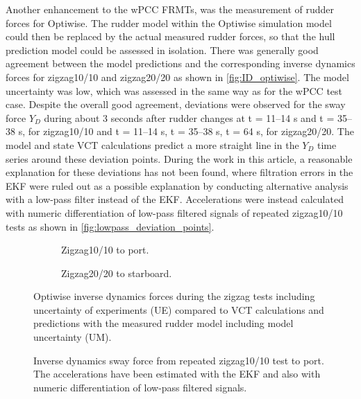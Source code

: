 Another enhancement to the wPCC FRMTs, was the measurement of rudder forces for Optiwise.
The rudder model within the Optiwise simulation model could then be replaced by the actual measured rudder forces, so that the hull prediction model could be assessed in isolation. There was generally good agreement between the model predictions and the corresponding inverse dynamics forces for zigzag10/10  and zigzag20/20 as shown in \autoref{fig:ID_optiwise}. The model uncertainty was low, which was assessed in the same way as for the wPCC test case.
Despite the overall good agreement, deviations were observed for the sway force $Y_D$ during about 3 seconds after rudder changes at t = 11--14 s and t = 35--38 s, for zigzag10/10 and t = 11--14 s, t = 35--38 s, t = 64 s, for zigzag20/20. The model and state VCT calculations predict a more straight line in the $Y_D$ time series around these deviation points. 
During the work in this article, a reasonable explanation for these deviations has not been found, where filtration errors in the EKF were ruled out as a possible explanation by conducting alternative analysis with a low-pass filter instead of the EKF. Accelerations were instead calculated with numeric differentiation of low-pass filtered signals of repeated zigzag10/10 tests as shown in \autoref{fig:lowpass_deviation_points}.
\begin{figure}[h]
    \centering
    \begin{subfigure}[b]{\textwidth}
        \centering
        
        \caption{Zigzag10/10 to port.}
        \label{fig:ID_measured_rudder_zigzag_10_10}
    \end{subfigure}
     \vfill
    \begin{subfigure}[b]{\textwidth}
        \centering
        
        \caption{Zigzag20/20 to starboard.}
        \label{fig:ID_measured_rudder_zigzag_20_20}
    \end{subfigure}
    \caption{Optiwise inverse dynamics forces during the zigzag tests including uncertainty of experiments (UE) compared to VCT calculations and predictions with the measured rudder model including model uncertainty (UM).}
    \label{fig:ID_optiwise}
\end{figure}
\begin{figure}[h]
    \centering
    
    \caption{Inverse dynamics sway force from repeated zigzag10/10 test to port. The accelerations have been estimated with the EKF and also with numeric differentiation of low-pass filtered signals.}
    \label{fig:lowpass_deviation_points}
\end{figure}
\FloatBarrier

